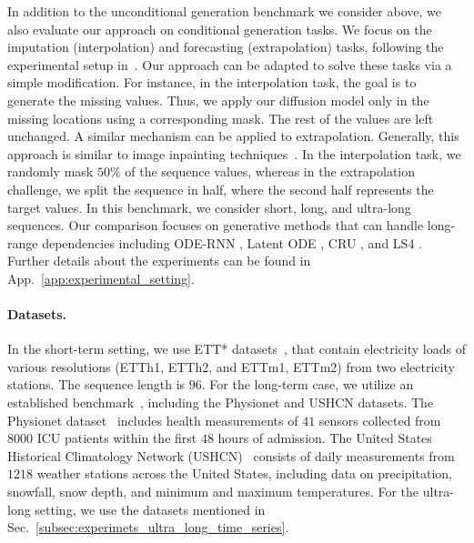 \documentclass{article}
\begin{document}
In addition to the unconditional generation benchmark we consider above, we also evaluate our approach on conditional generation tasks. We focus on the imputation (interpolation) and forecasting (extrapolation) tasks, following the experimental setup in~\cite{rubanova2019latent, schirmer2022modeling}. Our approach can be adapted to solve these tasks via a simple modification. For instance, in the interpolation task, the goal is to generate the missing values. Thus, we apply our diffusion model only in the missing locations using a corresponding mask. The rest of the values are left unchanged. A similar mechanism can be applied to extrapolation. Generally, this approach is similar to image inpainting techniques~\cite{lugmayr2022repaint}. In the interpolation task, we randomly mask $50\%$ of the sequence values, whereas in the extrapolation challenge, we split the sequence in half, where the second half represents the target values. In this benchmark, we consider short, long, and ultra-long sequences. Our comparison focuses on generative methods that can handle long-range dependencies including ODE-RNN \cite{rubanova2019latent}, Latent ODE \cite{rubanova2019latent}, CRU \cite{schirmer2022modeling}, and LS4 \cite{zhou2023deep}. Further details about the experiments can be found in App.~\ref{app:experimental_setting}. 




\paragraph{Datasets.} In the short-term setting, we use ETT* datasets~\cite{zhou2021informer}, that contain electricity loads of various resolutions (ETTh1, ETTh2, and ETTm1, ETTm2) from two electricity stations. The sequence length is $96$. For the long-term case, we utilize an established benchmark~\cite{rubanova2019latent, schirmer2022modeling, zhou2023deep}, including the Physionet and USHCN datasets. The Physionet dataset~\cite{silva2012predicting} includes health measurements of $41$ sensors collected from $8000$ ICU patients within the first $48$ hours of admission. The United States Historical Climatology Network (USHCN)~\cite{menne2015long} consists of daily measurements from $1218$ weather stations across the United States, including data on precipitation, snowfall, snow depth, and minimum and maximum temperatures. For the ultra-long setting, we use the datasets mentioned in Sec.~\ref{subsec:experimets_ultra_long_time_series}.
\end{document}
